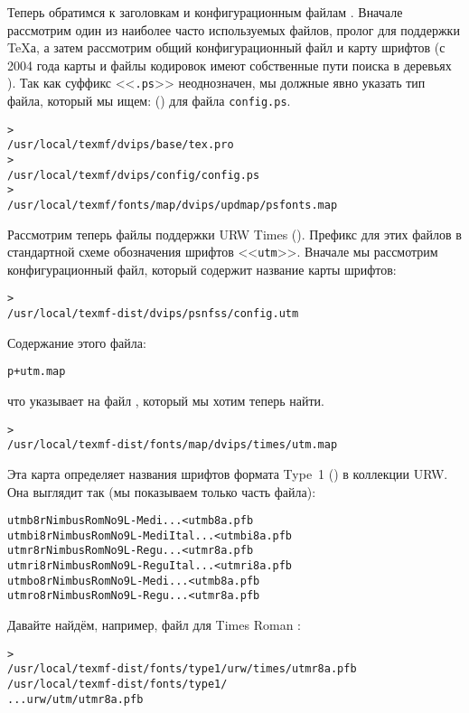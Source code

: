 \documentclass{article}
\renewcommand{\samp}[1]{<<\texttt{#1}>>}
\begin{document}
Теперь обратимся к заголовкам и конфигурационным файлам
.  Вначале рассмотрим один из наиболее часто
используемых файлов, пролог  для поддержки \TeX{}а, а
затем рассмотрим общий конфигурационный файл  и карту
шрифтов  (с 2004 года карты и файлы кодировок имеют
собственные пути поиска в деревьях ).  Так как суффикс
\samp{.ps} неоднозначен, мы должные явно указать тип файла, который мы
ищем: () для файла \texttt{config.ps}.
\begin{alltt}
> 
   /usr/local/texmf/dvips/base/tex.pro
> 
   /usr/local/texmf/dvips/config/config.ps
> 
   /usr/local/texmf/fonts/map/dvips/updmap/psfonts.map
\end{alltt}

Рассмотрим теперь файлы поддержки URW Times (\PS{}).  Префикс
для этих файлов в стандартной схеме обозначения шрифтов  \samp{utm}.
Вначале мы рассмотрим конфигурационный файл, который содержит название
карты шрифтов:
\begin{alltt}
> 
/usr/local/texmf-dist/dvips/psnfss/config.utm
\end{alltt}
Содержание этого файла:
\begin{alltt}
  p +utm.map
\end{alltt}
что указывает на файл , который мы хотим теперь найти. 
\begin{alltt}
> 
   /usr/local/texmf-dist/fonts/map/dvips/times/utm.map
\end{alltt}
Эта карта определяет названия шрифтов формата Type~1 (\PS{}) в
коллекции  URW.  Она выглядит так (мы показываем только часть файла):
\begin{alltt}
utmb8r  NimbusRomNo9L-Medi    ... <utmb8a.pfb
utmbi8r NimbusRomNo9L-MediItal... <utmbi8a.pfb
utmr8r  NimbusRomNo9L-Regu    ... <utmr8a.pfb
utmri8r NimbusRomNo9L-ReguItal... <utmri8a.pfb
utmbo8r NimbusRomNo9L-Medi    ... <utmb8a.pfb
utmro8r NimbusRomNo9L-Regu    ... <utmr8a.pfb
\end{alltt}
Давайте найдём, например, файл для  Times Roman
:
\begin{alltt}
> 
\ifSingleColumn   /usr/local/texmf-dist/fonts/type1/urw/times/utmr8a.pfb
\else   /usr/local/texmf-dist/fonts/type1/
... urw/utm/utmr8a.pfb
\fi\end{alltt}
\end{document}
